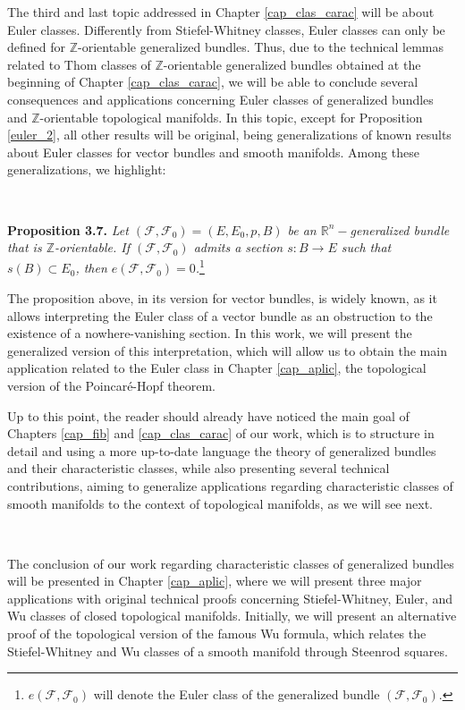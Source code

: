 \documentclass[12pt,oneside]{book}
\newcommand{\R}{\mathbb{R}}
\newcommand{\Z}{\mathbb{Z}}
\begin{document}
    The third and last topic addressed in Chapter \ref{cap_clas_carac} will be about Euler classes. 
    Differently from Stiefel-Whitney classes, Euler classes can only be defined for $\Z$-orientable 
    generalized bundles. Thus, due to the technical lemmas related to Thom classes of $\Z$-orientable 
    generalized bundles obtained at the beginning of Chapter \ref{cap_clas_carac}, we will be able to 
    conclude several consequences and applications concerning Euler classes of generalized bundles and 
    $\Z$-orientable topological manifolds. In this topic, except for Proposition \ref{euler_2}, all other 
    results will be original, being generalizations of known results about Euler classes for vector 
    bundles and smooth manifolds. Among these generalizations, we highlight:

    \

    \textbf{Proposition 3.7.} \textit{Let $(\mathcal{F},\mathcal{F}_{0})=(E,E_{0},p,B)$ be an 
    $\R^{n}-$generalized bundle that is $\Z$-orientable. If $(\mathcal{F},\mathcal{F}_{0})$ admits a 
    section $s:B\to E$ such that $s(B)\subset E_{0}$, then 
    $e(\mathcal{F},\mathcal{F}_{0})=0$.}\footnote{$e(\mathcal{F},\mathcal{F}_{0})$ will denote the Euler 
    class of the generalized bundle $(\mathcal{F},\mathcal{F}_{0})$.}

    The proposition above, in its version for vector bundles, is widely known, as it allows interpreting 
    the Euler class of a vector bundle as an obstruction to the existence of a nowhere-vanishing section. 
    In this work, we will present the generalized version of this interpretation, which will allow us to 
    obtain the main application related to the Euler class in Chapter \ref{cap_aplic}, the topological 
    version of the Poincaré-Hopf theorem.

    Up to this point, the reader should already have noticed the main goal of Chapters \ref{cap_fib} and 
    \ref{cap_clas_carac} of our work, which is to structure in detail and using a more up-to-date 
    language the theory of generalized bundles and their characteristic classes, while also presenting 
    several technical contributions, aiming to generalize applications regarding characteristic classes 
    of smooth manifolds to the context of topological manifolds, as we will see next.

    \

    The conclusion of our work regarding characteristic classes of generalized bundles will be presented 
    in Chapter \ref{cap_aplic}, where we will present three major applications with original technical 
    proofs concerning Stiefel-Whitney, Euler, and Wu classes of closed topological manifolds. Initially, 
    we will present an alternative proof of the topological version of the famous Wu formula, which 
    relates the Stiefel-Whitney and Wu classes of a smooth manifold through Steenrod squares.
\end{document}
